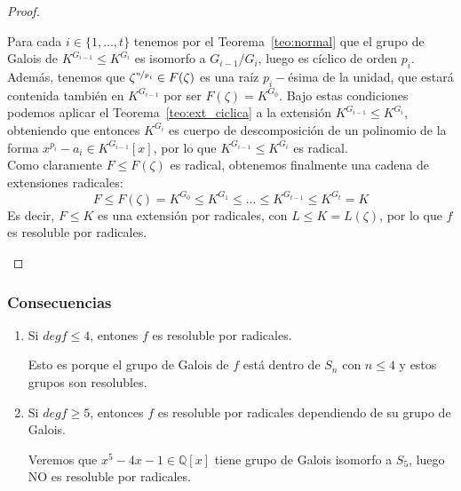 \begin{teo}
\begin{proof}
\begin{description}
                Para cada $i \in \{1,\ldots,t\}$ tenemos por el Teorema~\ref{teo:normal} que el grupo de Galois de $K^{G_{i-1}}\leq K^{G_{i}}$ es isomorfo a $G_{i-1}/G_i$, luego es cíclico de orden $p_i$. Además, tenemos que $\zeta^{\nicefrac{n}{p_i}}\in F(\zeta)$ es una raíz $p_i-$ésima de la unidad, que estará contenida también en $K^{G_{i-1}}$ por ser $F(\zeta) = K^{G_0}$. Bajo estas condiciones podemos aplicar el Teorema~\ref{teo:ext_ciclica} a la extensión $K^{G_{i-1}}\leq K^{G_{i}}$, obteniendo que entonces $K^{G_{i}}$ es cuerpo de descomposición de un polinomio de la forma $x^{p_i}-a_i \in K^{G_{i-1}}[x]$, por lo que $K^{G_{i-1}}\leq K^{G_{i}}$ es radical.\\

                Como claramente $F\leq F(\zeta)$ es radical, obtenemos finalmente una cadena de extensiones radicales:
                \begin{equation*}
                    F\leq F(\zeta) = K^{G_0} \leq K^{G_1} \leq \ldots \leq K^{G_{t-1}} \leq K^{G_t} = K
                \end{equation*}
                Es decir, $F\leq K$ es una extensión por radicales, con $L\leq K = L(\zeta)$, por lo que $f$ es resoluble por radicales.
        \end{description}
    \end{proof}
\end{teo}

\subsubsection{Consecuencias}
\begin{enumerate}
    \item Si $deg f\leq 4$, entones $f$ es resoluble por radicales.

        Esto es porque el grupo de Galois de $f$ está dentro de $S_n$ con $n\leq 4$ y estos grupos son resolubles.
    \item Si $degf \geq 5$, entonces $f$ es resoluble por radicales dependiendo de su grupo de Galois.

        Veremos que $x^5-4x-1\in \mathbb{Q}[x]$ tiene grupo de Galois isomorfo a $S_5$, luego NO es resoluble por radicales.
\end{enumerate}

